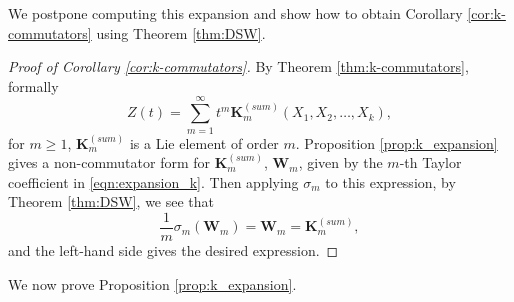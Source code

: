 \documentclass[11pt]{amsart}
\theoremstyle{plain}
\theoremstyle{remark}
\numberwithin{equation}{section}
\begin{document}
We postpone computing this expansion and show how to obtain Corollary \ref{cor:k-commutators} using Theorem \ref{thm:DSW}.
%
\begin{proof}[Proof of Corollary \ref{cor:k-commutators}]
By Theorem \ref{thm:k-commutators}, formally 
$$Z(t)=\sum_{m=1}^{\infty}t^m\mathbf{K}_m^{(sum)}(X_1,X_2,\ldots, X_k),$$
 for $m\geq 1$, $\mathbf{K}_m^{(sum)}$ is a Lie element of order $m$. %
%
Proposition \ref{prop:k_expansion} gives a non-commutator form for $\mathbf{K}_m^{(sum)}$, $\mathbf{W}_m$, given by the $m$-th Taylor coefficient in \eqref{eqn:expansion_k}. Then applying $\sigma_m$ to this expression, by Theorem \ref{thm:DSW}, we see that 
\begin{equation}
\frac{1}{m}\sigma_m (\mathbf{W}_m) = \mathbf{W}_m = \mathbf{K}_m^{(sum)},
\end{equation}
and the left-hand side gives the desired expression. 
\end{proof}
%
%
%
We now prove Proposition \ref{prop:k_expansion}.
%
%
\end{document}
